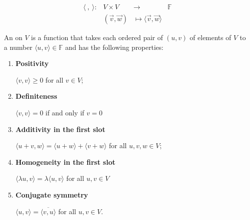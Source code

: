 \documentclass[11pt,fleqn]{book} %
\begin{document}
\setcounter{section}{0}
\setcounter{definitionT}{0}
\begin{definition}
    $$\begin{matrix} \langle~,~\rangle: &V \times V &\to &\mathbb{F} \\ &(\vec{v}, \vec{w}) &\mapsto \langle \vec{v}, \vec{w} \rangle \end{matrix}$$

    An  on $V$ is a function that takes each ordered pair of $(u, v)$ of elements of $V$ to a number $\langle u, v \rangle \in \mathbb{F}$ and has the following properties:
    
    \begin{enumerate}[label=\alph*)]
        \item \textbf{Positivity}
        
        $\langle v, v \rangle \ge 0$ for all $v \in V$;
        
        \item \textbf{Definiteness}
        
        $\langle v, v \rangle = 0$ if and only if $v = 0$
        
        \item \textbf{Additivity in the first slot}

        $\langle u + v, w \rangle = \langle u + w \rangle + \langle v + w \rangle$ for all $u, v, w \in V$;
        
        \item \textbf{Homogeneity in the first slot}

        $\langle \lambda u, v \rangle = \lambda\langle u, v\rangle$ for all $u, v \in V$
        
        \item \textbf{Conjugate symmetry}
        
        $\langle u, v \rangle = \overline{\langle v, u \rangle}$ for all $u, v \in V$.
    \end{enumerate}
\end{definition}
\setcounter{section}{3}
\end{document}
